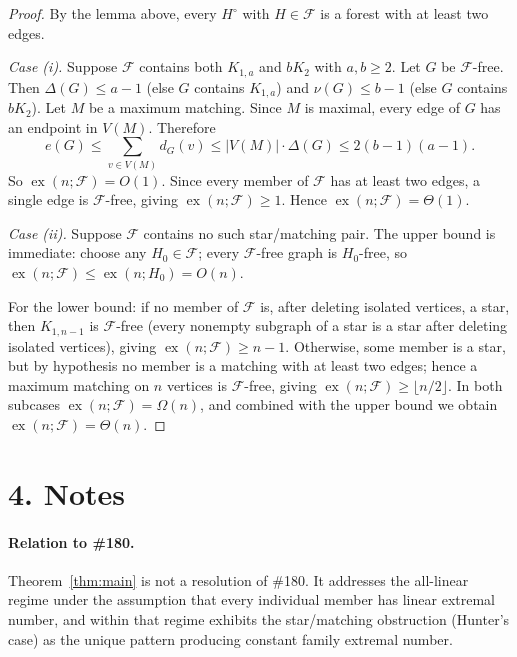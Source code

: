 \documentclass[11pt]{article}
\newcommand{\ex}{\operatorname{ex}}
\begin{document}
\begin{proof}
By the lemma above, every \(H^\circ\) with \(H\in\mathcal F\) is a forest
with at least two edges.

\emph{Case (i).} Suppose \(\mathcal F\) contains both \(K_{1,a}\) and
\(bK_2\) with \(a,b\ge 2\). Let \(G\) be \(\mathcal F\)-free. Then
\(\Delta(G)\le a-1\) (else \(G\) contains \(K_{1,a}\)) and
\(\nu(G)\le b-1\) (else \(G\) contains \(bK_2\)). Let \(M\) be a maximum
matching. Since \(M\) is maximal, every edge of \(G\) has an endpoint in
\(V(M)\). Therefore
\[
e(G)\le\sum_{v\in V(M)}d_G(v)\le |V(M)|\cdot\Delta(G)\le 2(b-1)(a-1).
\]
So \(\ex(n;\mathcal F)=O(1)\). Since every member of \(\mathcal F\) has
at least two edges, a single edge is \(\mathcal F\)-free, giving
\(\ex(n;\mathcal F)\ge 1\). Hence \(\ex(n;\mathcal F)=\Theta(1)\).

\emph{Case (ii).} Suppose \(\mathcal F\) contains no such star/matching
pair. The upper bound is immediate: choose any \(H_0\in\mathcal F\); every
\(\mathcal F\)-free graph is \(H_0\)-free, so
\(\ex(n;\mathcal F)\le\ex(n;H_0)=O(n)\).

For the lower bound: if no member of \(\mathcal F\) is, after deleting
isolated vertices, a star, then \(K_{1,n-1}\) is \(\mathcal F\)-free
(every nonempty subgraph of a star is a star after deleting isolated
vertices), giving \(\ex(n;\mathcal F)\ge n-1\). Otherwise, some member
is a star, but by hypothesis no member is a matching with at least two
edges; hence a maximum matching on \(n\) vertices is \(\mathcal F\)-free,
giving \(\ex(n;\mathcal F)\ge\lfloor n/2\rfloor\). In both subcases
\(\ex(n;\mathcal F)=\Omega(n)\), and combined with the upper bound we
obtain \(\ex(n;\mathcal F)=\Theta(n)\).
\end{proof}

\section*{4. Notes}

\paragraph{Relation to \#180.} Theorem~\ref{thm:main} is not a resolution
of \#180. It addresses the all-linear regime under the assumption that
every individual member has linear extremal number, and within that
regime exhibits the star/matching obstruction (Hunter's case) as the
unique pattern producing constant family extremal number.
\end{document}
